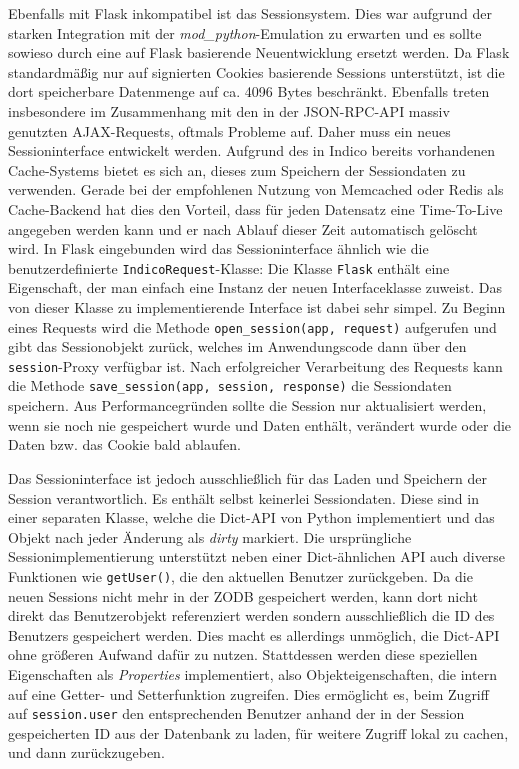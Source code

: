 Ebenfalls mit Flask inkompatibel ist das Sessionsystem. Dies war aufgrund der starken Integration
mit der \emph{mod\_python}-Emulation zu erwarten und es sollte sowieso durch eine auf Flask
basierende Neuentwicklung ersetzt werden. Da Flask standardmäßig nur auf signierten Cookies
basierende Sessions unterstützt, ist die dort speicherbare Datenmenge auf ca. 4096 Bytes beschränkt.
Ebenfalls treten insbesondere im Zusammenhang mit den in der JSON-RPC-API massiv genutzten AJAX-Requests,
oftmals Probleme auf. Daher muss ein neues Sessioninterface entwickelt werden. Aufgrund des in
Indico bereits vorhandenen Cache-Systems bietet es sich an, dieses zum Speichern der Sessiondaten zu
verwenden. Gerade bei der empfohlenen Nutzung von Memcached oder Redis als Cache-Backend hat dies
den Vorteil, dass für jeden Datensatz eine Time-To-Live angegeben werden kann und er nach Ablauf
dieser Zeit automatisch gelöscht wird. In Flask eingebunden wird das Sessioninterface ähnlich wie
die benutzerdefinierte \lstinline{IndicoRequest}-Klasse: Die Klasse \lstinline{Flask} enthält eine
Eigenschaft, der man einfach eine Instanz der neuen Interfaceklasse zuweist. Das von dieser Klasse
zu implementierende Interface ist dabei sehr simpel. Zu Beginn eines Requests wird die Methode
\lstinline{open_session(app, request)} aufgerufen und gibt das Sessionobjekt zurück, welches im
Anwendungscode dann über den \lstinline{session}-Proxy verfügbar ist. Nach erfolgreicher
Verarbeitung des Requests kann die Methode \lstinline{save_session(app, session, response)} die
Sessiondaten speichern. Aus Performancegründen sollte die Session nur aktualisiert werden, wenn sie
noch nie gespeichert wurde und Daten enthält, verändert wurde oder die Daten bzw. das Cookie bald
ablaufen.

Das Sessioninterface ist jedoch ausschließlich für das Laden und Speichern der Session
verantwortlich. Es enthält selbst keinerlei Sessiondaten. Diese sind in einer separaten Klasse,
welche die Dict-API von Python implementiert und das Objekt nach jeder Änderung als \emph{dirty}
markiert. Die ursprüngliche Sessionimplementierung unterstützt neben einer Dict-ähnlichen API auch
diverse Funktionen wie \lstinline{getUser()}, die den aktuellen Benutzer zurückgeben. Da die neuen
Sessions nicht mehr in der ZODB gespeichert werden, kann dort nicht direkt das Benutzerobjekt
referenziert werden sondern ausschließlich die ID des Benutzers gespeichert werden. Dies macht es
allerdings unmöglich, die Dict-API ohne größeren Aufwand dafür zu nutzen. Stattdessen werden diese
speziellen Eigenschaften als \emph{Properties} implementiert, also Objekteigenschaften, die intern
auf eine Getter- und Setterfunktion zugreifen. Dies ermöglicht es, beim Zugriff auf
\lstinline{session.user} den entsprechenden Benutzer anhand der in der Session gespeicherten ID aus
der Datenbank zu laden, für weitere Zugriff lokal zu cachen, und dann zurückzugeben.

